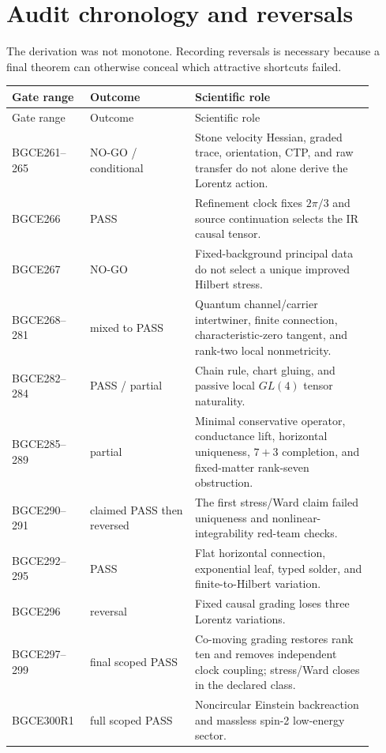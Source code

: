 \documentclass[11pt]{article}
\theoremstyle{definition}
\theoremstyle{remark}
\begin{document}
\section{Audit chronology and reversals}

The derivation was not monotone. Recording reversals is necessary because a final theorem can otherwise conceal which attractive shortcuts failed.

\begin{longtable}{>{\raggedright\arraybackslash}p{0.18\linewidth} >{\raggedright\arraybackslash}p{0.27\linewidth} >{\raggedright\arraybackslash}p{0.46\linewidth}}
\toprule
Gate range & Outcome & Scientific role \\
\midrule
\endfirsthead
\toprule
Gate range & Outcome & Scientific role \\
\midrule
\endhead
BGCE261--265 & NO-GO / conditional & Stone velocity Hessian, graded trace, orientation, CTP, and raw transfer do not alone derive the Lorentz action. \\
BGCE266 & PASS & Refinement clock fixes $2\pi/3$ and source continuation selects the IR causal tensor. \\
BGCE267 & NO-GO & Fixed-background principal data do not select a unique improved Hilbert stress. \\
BGCE268--281 & mixed to PASS & Quantum channel/carrier intertwiner, finite connection, characteristic-zero tangent, and rank-two local nonmetricity. \\
BGCE282--284 & PASS / partial & Chain rule, chart gluing, and passive local $GL(4)$ tensor naturality. \\
BGCE285--289 & partial & Minimal conservative operator, conductance lift, horizontal uniqueness, $7+3$ completion, and fixed-matter rank-seven obstruction. \\
BGCE290--291 & claimed PASS then reversed & The first stress/Ward claim failed uniqueness and nonlinear-integrability red-team checks. \\
BGCE292--295 & PASS & Flat horizontal connection, exponential leaf, typed solder, and finite-to-Hilbert variation. \\
BGCE296 & reversal & Fixed causal grading loses three Lorentz variations. \\
BGCE297--299 & final scoped PASS & Co-moving grading restores rank ten and removes independent clock coupling; stress/Ward closes in the declared class. \\
BGCE300R1 & full scoped PASS & Noncircular Einstein backreaction and massless spin-2 low-energy sector. \\

\end{longtable}
\end{document}
